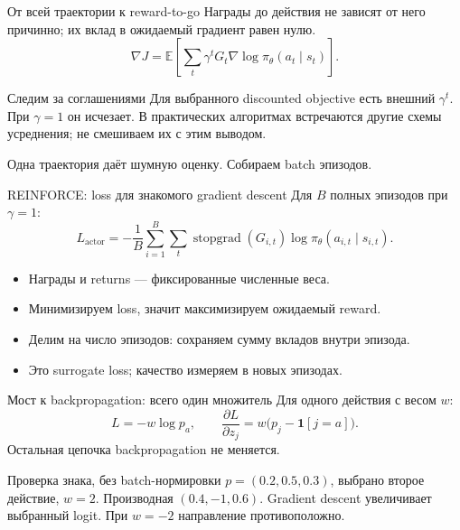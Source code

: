 \documentclass[aspectratio=169]{beamer}
\begin{document}
\begin{frame}{От всей траектории к reward-to-go}
  Награды до действия не зависят от него причинно;
  их вклад в ожидаемый градиент равен нулю.
  \[
    \nabla J=\mathbb E\left[\sum_t
    \gamma^t G_t\nabla\log\pi_\theta(a_t\mid s_t)\right].
  \]
  \begin{alertblock}{Следим за соглашениями}
    Для выбранного discounted objective есть внешний $\gamma^t$.
    При $\gamma=1$ он исчезает. В практических алгоритмах встречаются
    другие схемы усреднения; не смешиваем их с этим выводом.
  \end{alertblock}
  Одна траектория даёт шумную оценку. Собираем batch эпизодов.
\end{frame}

\begin{frame}{REINFORCE: loss для знакомого gradient descent}
  Для $B$ полных эпизодов при $\gamma=1$:
  \[
    L_{\mathrm{actor}}=-\frac1B\sum_{i=1}^{B}\sum_t
    \operatorname{stopgrad}(G_{i,t})
    \log\pi_\theta(a_{i,t}\mid s_{i,t}).
  \]
  \begin{itemize}
    \item Награды и returns --- фиксированные численные веса.
    \item Минимизируем loss, значит максимизируем ожидаемый reward.
    \item Делим на число эпизодов: сохраняем сумму вкладов внутри эпизода.
    \item Это surrogate loss; качество измеряем в новых эпизодах.
  \end{itemize}
\end{frame}

\begin{frame}{Мост к backpropagation: всего один множитель}
  Для одного действия с весом $w$:
  \[
    L=-w\log p_a,\qquad
    \boxed{\frac{\partial L}{\partial z_j}
    =w\bigl(p_j-\mathbf1[j=a]\bigr).}
  \]
  Остальная цепочка backpropagation не меняется.
  \begin{exampleblock}{Проверка знака, без batch-нормировки}
    $p=(0.2,0.5,0.3)$, выбрано второе действие, $w=2$.
    Производная $(0.4,-1,0.6)$.
    Gradient descent увеличивает выбранный logit.
    При $w=-2$ направление противоположно.
  \end{exampleblock}
\end{frame}
\end{document}
